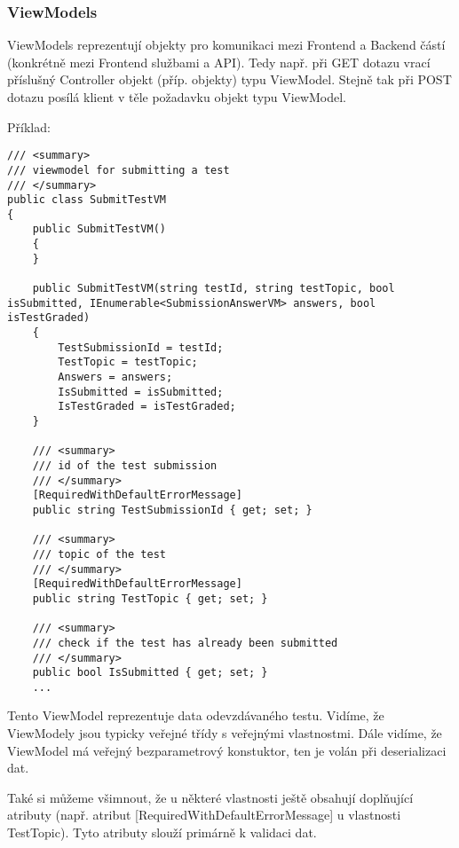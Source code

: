 \subsubsection*{ViewModels}

ViewModels reprezentují objekty pro komunikaci mezi Frontend a Backend částí (konkrétně mezi Frontend službami a API). Tedy např. při GET dotazu vrací příslušný Controller objekt (příp. objekty) typu ViewModel. Stejně tak při POST dotazu posílá klient v těle požadavku objekt typu ViewModel.

Příklad:
\begin{lstlisting}
/// <summary>
/// viewmodel for submitting a test
/// </summary>
public class SubmitTestVM
{
	public SubmitTestVM()
	{
	}
	
	public SubmitTestVM(string testId, string testTopic, bool isSubmitted, IEnumerable<SubmissionAnswerVM> answers, bool isTestGraded)
	{
		TestSubmissionId = testId;
		TestTopic = testTopic;
		Answers = answers;
		IsSubmitted = isSubmitted;
		IsTestGraded = isTestGraded;
	}
	
	/// <summary>
	/// id of the test submission
	/// </summary>
	[RequiredWithDefaultErrorMessage]
	public string TestSubmissionId { get; set; }
	
	/// <summary>
	/// topic of the test
	/// </summary>
	[RequiredWithDefaultErrorMessage]
	public string TestTopic { get; set; }
	
	/// <summary>
	/// check if the test has already been submitted
	/// </summary>
	public bool IsSubmitted { get; set; }
	...
\end{lstlisting}

Tento ViewModel reprezentuje data odevzdávaného testu. Vidíme, že ViewModely jsou typicky veřejné třídy s veřejnými vlastnostmi. Dále vidíme, že ViewModel má veřejný bezparametrový konstuktor, ten je volán při deserializaci dat.

Také si můžeme všimnout, že u některé vlastnosti ještě obsahují doplňující atributy (např. atribut [RequiredWithDefaultErrorMessage] u vlastnosti TestTopic). Tyto atributy slouží primárně k validaci dat.

